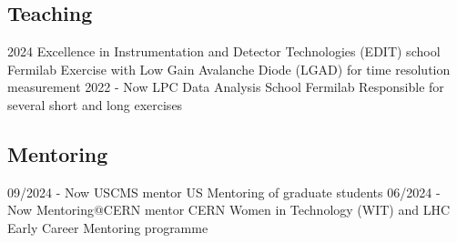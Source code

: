 \subsection{Teaching}
\position
      {2024} 
      {Excellence in Instrumentation and Detector Technologies (EDIT) school}
      {Fermilab}
      {Exercise with Low Gain Avalanche Diode (LGAD) for time resolution measurement}
	\position
      {2022 - Now} 
      {LPC Data Analysis School}
      {Fermilab}
      {Responsible for several short and long exercises}
\subsection{Mentoring}
	\position
      {09/2024 - Now } 
      {USCMS mentor}
      {US}
      {Mentoring of graduate students}
	\position
      {06/2024 - Now } 
      {Mentoring@CERN mentor}
      {CERN}
      {Women in Technology (WIT) and LHC Early Career Mentoring programme}
